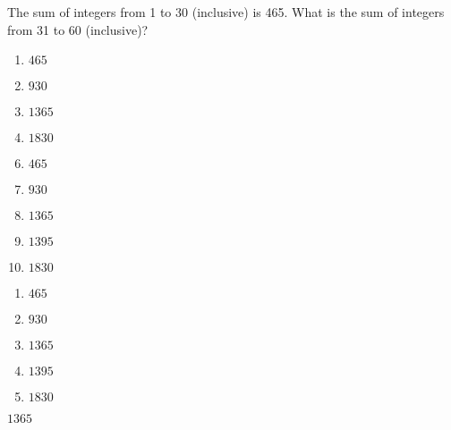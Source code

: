 


 The sum of integers from 1 to 30 (inclusive) is 465.  What is the sum of integers from 31 to 60 (inclusive)?



\ifsat
	\begin{enumerate}[label=\Alph*)]
		\item  $465$ 
		\item  $930$  
		\item  $1365$ %
		\item  $1830$
	\end{enumerate}
\else
\fi

\ifacteven
	\begin{enumerate}[label=\textbf{\Alph*.},itemsep=\fill,align=left]
		\setcounter{enumii}{5}
		\item  $465$ 
		\item  $930$  
		\item  $1365$ %
		\addtocounter{enumii}{1}
		\item  $1395$ 
		\item  $1830$
	\end{enumerate}
\else
\fi

\ifactodd
	\begin{enumerate}[label=\textbf{\Alph*.},itemsep=\fill,align=left]
		\item  $465$ 
		\item  $930$  
		\item  $1365$ %
		\item  $1395$ 
		\item  $1830$
	\end{enumerate}
\else
\fi

\ifgridin
  $1365$ %
		
\else
\fi

